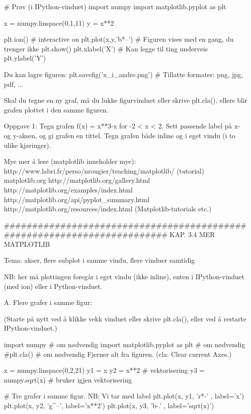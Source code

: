 \documentclass[a4paper,11pt,utf8]{book}
\begin{document}
# Prøv (i IPython-vinduet)
import numpy 
import matplotlib.pyplot as plt 

x = numpy.linspace(0,1,11)
y = x**2

plt.ion()              # interactive on 
plt.plot(x,y,'b*--')   # Figuren vises med en gang, du trenger ikke plt.show()
plt.xlabel('X')        # Kan legge til ting underveis
plt.ylabel('Y') 

Du kan lagre figuren: 
plt.savefig('x_i_andre.png')   # Tillatte formater: png, jpg, pdf, ... 


Skal du tegne en ny graf, må du lukke figurvinduet eller skrive plt.cla(), 
ellers blir grafen plottet i den samme figuren. 



Oppgave 1: Tegn grafen f(x) = x**3-x for -2 < x < 2. 
Sett passende label på x- og y-aksen, og gi grafen en tittel.
Tegn grafen både inline og i eget vindu (i to ulike kjøringer). 



Mye mer å lese (matplotlib inneholder mye): 
http://www.labri.fr/perso/nrougier/teaching/matplotlib/  (tutorial) 
matplotlib.org
http://matplotlib.org/gallery.html 
http://matplotlib.org/examples/index.html
http://matplotlib.org/api/pyplot_summary.html
http://matplotlib.org/resources/index.html  (Matplotlib-tutorials etc.)


######################################################################## 
KAP. 3.4  MER MATPLOTLIB

Tema: akser, flere subplot i samme vindu, flere vinduer samtidig 

NB: her må plottingen foregår i eget vindu (ikke inline), 
enten i IPython-vinduet (med ion) eller i Python-vinduet. 



A. Flere grafer i samme figur: 

(Starte på nytt ved å klikke vekk vinduet eller skrive plt.cla(), eller ved å restarte IPython-vinduet.) 

import numpy                        # om nødvendig
import matplotlib.pyplot as plt     # om nødvendig
#plt.cla()                          # om nødvendig  Fjerner alt fra figuren. (cla: Clear current Axes.) 

x = numpy.linspace(0,2,21)
y1 = x
y2 = x**2                 # vektorisering 
y3 = numpy.sqrt(x)        # bruker igjen vektorisering

# Tre grafer i samme figur. NB: Vi tar med label
plt.plot(x, y1, 'r*-' , label='x')
plt.plot(x, y2, 'g^--', label='x**2')
plt.plot(x, y3, 'b-.' , label='sqrt(x)') 
\end{document}
